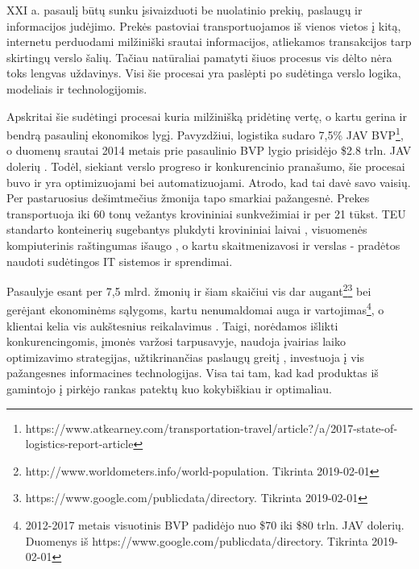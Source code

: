 
XXI a. pasaulį būtų sunku įsivaizduoti be nuolatinio prekių, paslaugų ir informacijos judėjimo. Prekės pastoviai transportuojamos iš vienos vietos į kitą, internetu perduodami milžiniški srautai informacijos, atliekamos transakcijos tarp skirtingų verslo šalių. Tačiau natūraliai pamatyti šiuos procesus vis dėlto nėra toks lengvas uždavinys. Visi šie procesai yra paslėpti po sudėtinga verslo logika, modeliais ir technologijomis. 

Apskritai šie sudėtingi procesai kuria milžinišką pridėtinę vertę, o kartu gerina ir bendrą pasaulinį ekonomikos lygį. Pavyzdžiui, logistika sudaro 7,5\% JAV BVP\footnote{https://www.atkearney.com/transportation-travel/article?/a/2017-state-of-logistics-report-article}, o duomenų srautai 2014 metais prie pasaulinio BVP lygio prisidėjo \$2.8 trln. JAV dolerių \cite{manyika2016digital}. Todėl, siekiant verslo progreso ir konkurencinio pranašumo, šie procesai buvo ir yra optimizuojami bei automatizuojami. Atrodo, kad tai davė savo vaisių. Per pastaruosius dešimtmečius žmonija tapo smarkiai pažangesnė. Prekes transportuoja iki 60 tonų vežantys krovininiai sunkvežimiai \cite{lumsden2004truck} ir per 21 tūkst. TEU standarto konteinerių sugebantys plukdyti krovininiai laivai \cite{halff2019likely}, visuomenės kompiuterinis raštingumas išaugo \cite{van2015internet}, o kartu skaitmenizavosi ir verslas - pradėtos naudoti sudėtingos IT sistemos ir sprendimai.

Pasaulyje esant per 7,5 mlrd. žmonių ir šiam skaičiui vis dar augant\footnote{http://www.worldometers.info/world-population. Tikrinta 2019-02-01}\footnote{\label{note1}https://www.google.com/publicdata/directory. Tikrinta 2019-02-01} bei gerėjant ekonominėms sąlygoms, kartu nenumaldomai auga ir vartojimas\footnote{2012-2017 metais visuotinis BVP padidėjo nuo \$70 iki \$80 trln. JAV dolerių. Duomenys iš https://www.google.com/publicdata/directory. Tikrinta 2019-02-01}, o klientai kelia vis aukštesnius reikalavimus \cite{nilsson2006logistics}. Taigi, norėdamos išlikti konkurencingomis, įmonės varžosi tarpusavyje, naudoja įvairias laiko optimizavimo strategijas, užtikrinančias paslaugų greitį \cite{zacharia2004logistics}, investuoja į vis pažangesnes informacines technologijas. Visa tai tam, kad kad produktas iš gamintojo į pirkėjo rankas patektų kuo kokybiškiau ir optimaliau.

